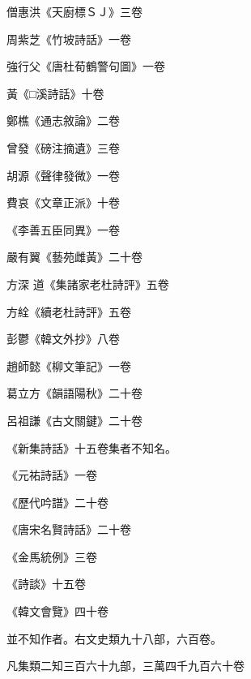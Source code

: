 \begin{pinyinscope}
 僧惠洪《天廚標ＳＪ》三卷



 周紫芝《竹坡詩話》一卷



 強行父《唐杜荀鶴警句圖》一卷



 黃《□溪詩話》十卷



 鄭樵《通志敘論》二卷



 曾發《磅注摘遺》三卷



 胡源《聲律發微》一卷



 費哀《文章正派》十卷



 《李善五臣同異》一卷



 嚴有翼《藝苑雌黃》二十卷



 方深
 道《集諸家老杜詩評》五卷



 方絟《續老杜詩評》五卷



 彭鬱《韓文外抄》八卷



 趙師懿《柳文筆記》一卷



 葛立方《韻語陽秋》二十卷



 呂祖謙《古文關鍵》二十卷



 《新集詩話》十五卷集者不知名。



 《元祐詩話》一卷



 《歷代吟譜》二十卷



 《唐宋名賢詩話》二十卷



 《金馬統例》三卷



 《詩談》十五卷



 《韓文會覽》四十卷



 並不知作者。右文史類九十八部，六百卷。



 凡集類二知三百六十九部，三萬四千九百六十卷



\end{pinyinscope}